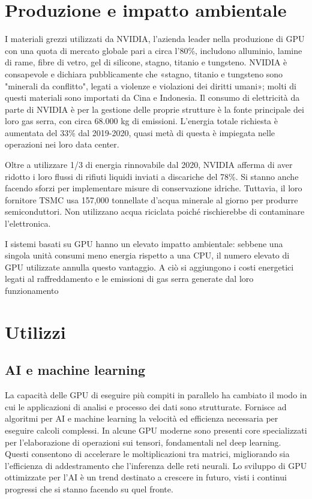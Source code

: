 \documentclass[12pt,a4paper,oneside]{book}
\begin{document}
\section{Produzione e impatto ambientale}

I materiali grezzi utilizzati da NVIDIA, l'azienda leader nella produzione di GPU con una quota di mercato globale pari a circa l’80\%, includono alluminio, lamine di rame, fibre di vetro, gel di silicone, stagno, titanio e tungsteno. NVIDIA è consapevole e dichiara pubblicamente che «stagno, titanio e tungsteno sono "minerali da conflitto", legati a violenze e violazioni dei diritti umani»; molti di questi materiali sono importati da Cina e Indonesia.
Il consumo di elettricità da parte di NVIDIA è per la gestione delle proprie strutture è la fonte principale dei loro gas serra, con circa 68.000 kg di emissioni. L'energia totale richiesta è aumentata del 33\% dal 2019-2020, quasi metà di questa è impiegata nelle operazioni nei loro data center.

Oltre a utilizzare 1/3 di energia rinnovabile dal 2020, NVIDIA afferma di aver ridotto i loro flussi di rifiuti liquidi inviati a discariche del 78\%. Si stanno anche facendo sforzi per implementare misure di conservazione idriche. Tuttavia, il loro fornitore TSMC usa 157,000 tonnellate d'acqua minerale al giorno per produrre semiconduttori. Non utilizzano acqua riciclata  poiché rischierebbe di contaminare l'elettronica.

I sistemi basati su GPU hanno un elevato impatto ambientale: sebbene una singola unità consumi meno energia rispetto a una CPU, il numero elevato di GPU utilizzate annulla questo vantaggio. A ciò si aggiungono i costi energetici legati al raffreddamento e le emissioni di gas serra generate dal loro funzionamento

\section{Utilizzi}

\subsection{AI e machine learning}

La capacità delle GPU di eseguire più compiti in parallelo ha cambiato il modo in cui le applicazioni di analisi e processo dei dati sono strutturate. Fornisce ad algoritmi per AI e machine learning la velocità ed efficienza necessaria per eseguire calcoli complessi.
In alcune GPU moderne sono presenti core specializzati per l'elaborazione di operazioni sui tensori, fondamentali nel deep learning. Questi consentono di accelerare le moltiplicazioni tra matrici, migliorando sia l'efficienza di addestramento che l'inferenza delle reti neurali.
Lo sviluppo di GPU ottimizzate per l'AI è un trend destinato a crescere in futuro, visti i continui progressi che si stanno facendo su quel fronte.
\end{document}
